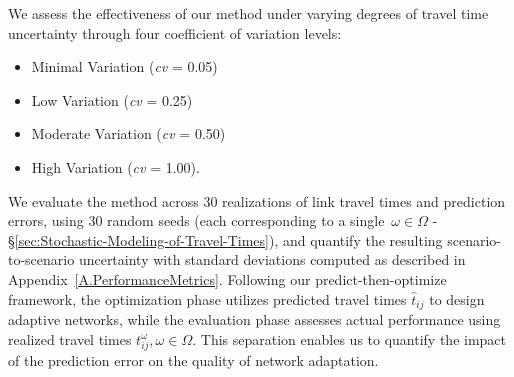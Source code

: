 \documentclass[a4paper,fleqn]{cas-sc}
\begin{document}
We assess the effectiveness of our method under varying degrees of travel time uncertainty through four coefficient of variation levels: 
\begin{itemize}
    \item Minimal Variation (\textit{cv} = 0.05)
    \item Low Variation (\textit{cv} = 0.25)
    \item Moderate Variation (\textit{cv} = 0.50)
    \item High Variation (\textit{cv} = 1.00).
\end{itemize}
We evaluate the method across 30 realizations of link travel times and prediction errors, using 30 random seeds (each corresponding to a single~$\omega\in\Omega$ -  \S{}\ref{sec:Stochastic-Modeling-of-Travel-Times}), and quantify the resulting scenario-to-scenario uncertainty with standard deviations computed as described in Appendix~\ref{A.PerformanceMetrics}.
%
Following our predict-then-optimize framework, the optimization phase utilizes predicted travel times $\hat{t}_{ij}$ to design adaptive networks, while the evaluation phase assesses actual performance using realized travel times $t_{ij}^\omega,\omega\in\Omega$. This separation enables us to quantify the impact of the prediction error on the quality of network adaptation.
\end{document}
